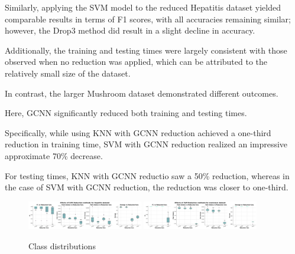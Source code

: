 Similarly, applying the SVM model to the reduced Hepatitis dataset yielded comparable results in terms of F1 scores, with all accuracies remaining similar; however, the Drop3 method did result in a slight decline in accuracy.

Additionally, the training and testing times were largely consistent with those observed when no reduction was applied, which can be attributed to the relatively small size of the dataset.

In contrast, the larger Mushroom dataset demonstrated different outcomes. 

Here, GCNN significantly reduced both training and testing times. 

Specifically, while using KNN with GCNN reduction achieved a one-third reduction in training time, SVM with GCNN reduction realized an impressive approximate 70\% decrease. 

For testing times, KNN with GCNN reductio saw a 50\% reduction, whereas in the case of SVM with GCNN reduction, the reduction was closer to one-third.

\begin{figure}
    \centering
    \includegraphics[width=0.45\textwidth]{figures/SVM_reduction_effects_hepatitis.png}
    \includegraphics[width=0.45\textwidth]{figures/SVM_reduction_effects_mushroom.png}
    \caption{Class distributions}
    \label{fig:SVM-reduction-effects}
\end{figure}



